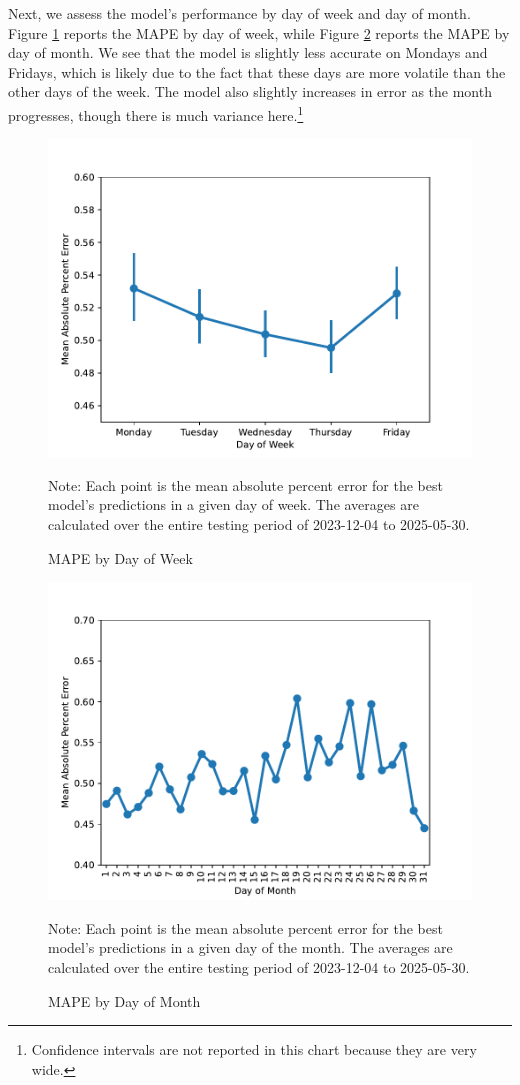 \documentclass[12pt]{article}
\begin{document}
Next, we assess the model's performance by day of week and day of month. Figure \ref{fig:mape_by_day_of_week} reports the MAPE by day of week, while Figure \ref{fig:mape_by_day_of_month} reports the MAPE by day of month. We see that the model is slightly less accurate on Mondays and Fridays, which is likely due to the fact that these days are more volatile than the other days of the week. The model also slightly increases in error as the month progresses, though there is much variance here.\footnote{Confidence intervals are not reported in this chart because they are very wide.}
\begin{figure}[H]
    \centering
    \caption{MAPE by Day of Week}
    \includegraphics[width=0.6\linewidth]{../Output/mape_by_day_of_week.pdf}
    \begin{minipage}{0.6\linewidth}
        \footnotesize
        \singlespacing
        Note: Each point is the mean absolute percent error for the best model's predictions in a given day of week. The averages are calculated over the entire testing period of 2023-12-04 to 2025-05-30.
    \end{minipage}
    \label{fig:mape_by_day_of_week}
\end{figure}

\begin{figure}[H]
    \centering
    \caption{MAPE by Day of Month}
    \includegraphics[width=0.6\linewidth]{../Output/mape_by_day_of_month.pdf}
    \begin{minipage}{0.6\linewidth}
        \footnotesize
        \singlespacing
        Note: Each point is the mean absolute percent error for the best model's predictions in a given day of the month. The averages are calculated over the entire testing period of 2023-12-04 to 2025-05-30.
    \end{minipage}
    \label{fig:mape_by_day_of_month}
\end{figure}
\end{document}
